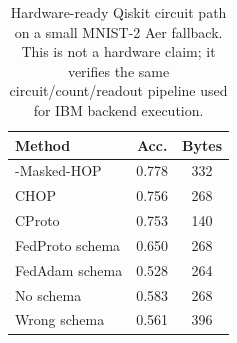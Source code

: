 \begin{table}[t]
\centering
\caption{Hardware-ready Qiskit circuit path on a small MNIST-2 Aer fallback. This is not a hardware claim; it verifies the same circuit/count/readout pipeline used for IBM backend execution.}
\label{tab:hardware-ready}
\begin{tabular}{lcc}
\toprule
Method & Acc. & Bytes \\
\midrule
\method{}-Masked-HOP & 0.778 & 332 \\
CHOP & 0.756 & 268 \\
CProto & 0.753 & 140 \\
FedProto schema & 0.650 & 268 \\
FedAdam schema & 0.528 & 264 \\
No schema & 0.583 & 268 \\
Wrong schema & 0.561 & 396 \\
\bottomrule
\end{tabular}
\end{table}
